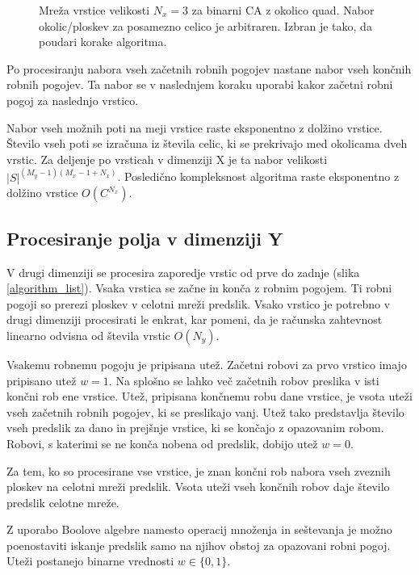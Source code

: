 \documentclass[12pt,a4paper,openany,twoside]{book}
\begin{document}
\begin{figure}[htb]
\centerline{}
\caption[Algoritem procesiranja vrstice.]{Mreža vrstice velikosti \(N_x=3\) za binarni CA z okolico quad.
Nabor okolic/ploskev za posamezno celico je arbitraren. Izbran je tako, da poudari korake algoritma.}
\label{algorithm_line}
\end{figure}

Po procesiranju nabora vseh začetnih robnih pogojev nastane nabor vseh končnih robnih pogojev.
Ta nabor se v naslednjem koraku uporabi kakor začetni robni pogoj za naslednjo vrstico.

Nabor vseh možnih poti na meji vrstice raste eksponentno z dolžino vrstice.
Število vseh poti se izračuna iz števila celic, ki se prekrivajo med okolicama dveh vrstic.
Za deljenje po vrsticah v dimenziji X je ta nabor velikosti \( |S|^{(M_y-1)(M_x-1+N_x)} \).
Posledično kompleksnost algoritma raste eksponentno z dolžino vrstice \(O(C^{N_x})\).

\subsection{Procesiranje polja v dimenziji Y}

V drugi dimenziji se procesira zaporedje vrstic od prve do zadnje (slika \ref{algorithm_list}).
Vsaka vrstica se začne in konča z robnim pogojem.
Ti robni pogoji so prerezi ploskev v celotni mreži predslik.
Vsako vrstico je potrebno v drugi dimenziji procesirati le enkrat, kar pomeni,
da je računska zahtevnost linearno odvisna od števila vrstic \(O(N_y)\).

Vsakemu robnemu pogoju je pripisana utež. Začetni robovi za prvo vrstico imajo pripisano utež \(w=1\).
Na splošno se lahko več začetnih robov preslika v isti končni rob ene vrstice.
Utež, pripisana končnemu robu dane vrstice, je vsota uteži vseh začetnih robnih pogojev, ki se preslikajo vanj.
Utež tako predstavlja število vseh predslik za dano in prejšnje vrstice, ki se končajo z opazovanim robom.
Robovi, s katerimi se ne konča nobena od predslik, dobijo utež \(w=0\).

Za tem, ko so procesirane vse vrstice, je znan končni rob nabora vseh zveznih ploskev na celotni mreži predslik.
Vsota uteži vseh končnih robov daje število predslik celotne mreže.

Z uporabo Boolove algebre namesto operacij množenja in seštevanja
je možno poenostaviti iskanje predslik samo na njihov obstoj za opazovani robni pogoj.
Uteži postanejo binarne vrednosti \(w \in \{0, 1\}\).
\end{document}
